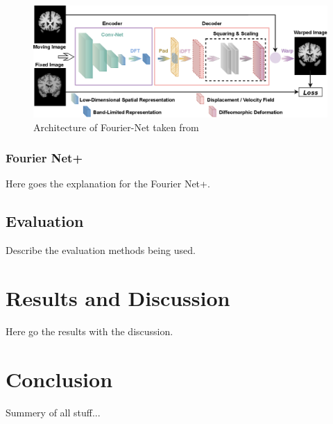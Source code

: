 \documentclass[english,version-2022-01]{uzl-thesis} %
\begin{document}
\begin{figure}[htpb]
	\centering
	\graphicspath{{images/}{\main/images/}}
	\includegraphics[width=\linewidth]{ArchitectureFourier-Net.png} 
	\caption{Architecture of Fourier-Net taken from~\cite{Fourier-Net}}
	\label{fig:Fourier-Net}
\end{figure}


\subsection{Fourier Net+}
Here goes the explanation for the Fourier Net+.

\section{Evaluation}
Describe the evaluation methods being used.



\chapter{Results and Discussion}
Here go the results with the discussion.



\chapter{Conclusion}
Summery of all stuff...
\end{document}
